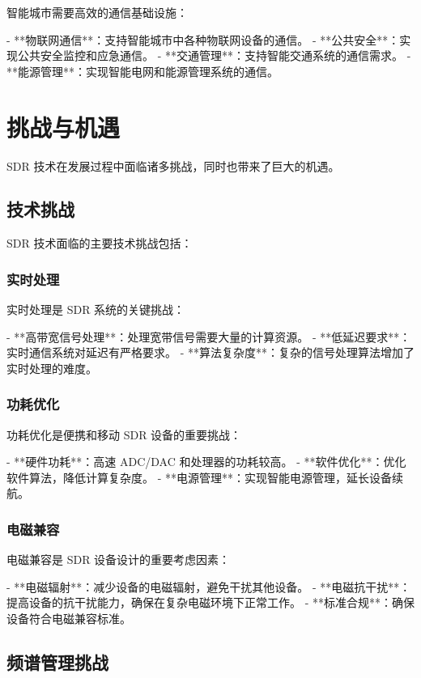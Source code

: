 \documentclass[UTF8]{ctexbook}
\begin{document}
智能城市需要高效的通信基础设施：

- **物联网通信**：支持智能城市中各种物联网设备的通信。
- **公共安全**：实现公共安全监控和应急通信。
- **交通管理**：支持智能交通系统的通信需求。
- **能源管理**：实现智能电网和能源管理系统的通信。

\section{挑战与机遇}

SDR 技术在发展过程中面临诸多挑战，同时也带来了巨大的机遇。

\subsection{技术挑战}

SDR 技术面临的主要技术挑战包括：

\subsubsection{实时处理}

实时处理是 SDR 系统的关键挑战：

- **高带宽信号处理**：处理宽带信号需要大量的计算资源。
- **低延迟要求**：实时通信系统对延迟有严格要求。
- **算法复杂度**：复杂的信号处理算法增加了实时处理的难度。

\subsubsection{功耗优化}

功耗优化是便携和移动 SDR 设备的重要挑战：

- **硬件功耗**：高速 ADC/DAC 和处理器的功耗较高。
- **软件优化**：优化软件算法，降低计算复杂度。
- **电源管理**：实现智能电源管理，延长设备续航。

\subsubsection{电磁兼容}

电磁兼容是 SDR 设备设计的重要考虑因素：

- **电磁辐射**：减少设备的电磁辐射，避免干扰其他设备。
- **电磁抗干扰**：提高设备的抗干扰能力，确保在复杂电磁环境下正常工作。
- **标准合规**：确保设备符合电磁兼容标准。

\subsection{频谱管理挑战}
\end{document}
